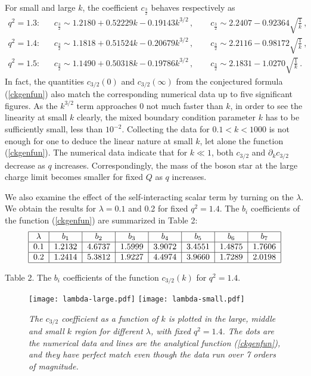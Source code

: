 \documentclass[11pt]{article}
\newcommand{\be}{\begin{equation}}
\newcommand{\ee}{\end{equation}}
\newcommand{\bea}{\setlength\arraycolsep{2pt} \begin{eqnarray}}
\newcommand{\eea}{\end{eqnarray}}
\newcommand{\nn}{\nonumber}
\def\fft#1#2{{\frac{#1}{#2}}}
\begin{document}
For small and large $k$, the coefficient $c_{\fft32}$ behaves respectively as
\bea
q^2=1.3:&& c_{\fft32} \sim1.2180 + 0.52229 k - 0.19143 k^{3/2} \,,\qquad c_{\fft32}\sim 2.2407-0.92364 \sqrt{\frac{1}{k}}\,,\nn\\
q^2=1.4:&& c_{\fft32} \sim1.1818 + 0.51524 k - 0.20679 k^{3/2}\,,\qquad c_{\fft32}\sim 2.2116-0.98172 \sqrt{\frac{1}{k}} \,,\nn\\
q^2=1.5:&& c_{\fft32} \sim 1.1490 + 0.50318 k - 0.19786 k^{3/2}\,,\qquad c_{\fft32}\sim 2.1831-1.0270 \sqrt{\frac{1}{k}}\,.
\eea
In fact, the quantities $c_{3/2}(0)$ and $c_{3/2}(\infty)$ from the conjectured formula (\ref{ckgenfun}) also match the corresponding numerical data up to five significant figures. As the  $k^{3/2}$ term approaches 0 not much faster than $k$, in order to see the linearity at small $k$ clearly, the mixed boundary condition parameter $k$ has to be sufficiently small, less than $10^{-2}$.  Collecting the data for $0.1<k<1000$ is not enough for one to deduce the linear nature at small $k$, let alone the function (\ref{ckgenfun}).  The numerical data indicate that for $k\ll 1$, both $c_{3/2}$ and $\partial_k c_{3/2}$ decrease as $q$ increases. Correspondingly, the mass of the boson star at the large charge limit becomes smaller for fixed $Q$ as $q$ increases.

We also examine the effect of the self-interacting scalar term by turning on the $\lambda$. We obtain the results for $\lambda=0.1$ and 0.2 for fixed $q^2=1.4$.  The $b_i$ coefficients of the function (\ref{ckgenfun}) are summarized in Table 2:
\be
\begin{tabular}{|c|c|c|c|c|c|c|c|}
  \hline
  $\lambda $ & $b_1$ & $b_2$ & $b_3$ & $b_4$ & $b_5$ & $b_6$ & $b_7$ \\
  \hline
 $0.1$ & $1.2132$ & $4.6737$ & $1.5999$ & $3.9072$ & $3.4551$ & $1.4875$ & $1.7606$ \\
  \hline
  $0.2$ & $1.2414$ & $5.3812$ & $1.9227$ & $4.4974$ & $3.9660$ & $1.7289$ & $2.0198$ \\
\hline
\end{tabular}
\ee
\centerline{Table 2. \small The $b_i$ coefficients of the function $c_{3/2}(k)$ for $q^2=1.4$.}

\begin{figure}[htp]
\begin{center}
\texttt{[image: lambda-large.pdf]}
\texttt{[image: lambda-small.pdf]}
\end{center}
\caption{\small\it The $c_{3/2}$ coefficient as a function of $k$ is plotted in the large, middle and small $k$ region for different $\lambda$, with fixed $q^2=1.4$.  The dots are the numerical data and lines are the analytical function (\ref{ckgenfun}), and they have perfect match even though the data run over 7 orders of magnitude.}
\label{lambda-all}
\end{figure}
\end{document}
